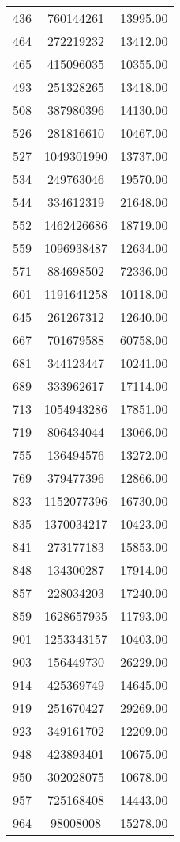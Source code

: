 \begin{centering}
\begin{supertabular}{|c|c|c|}
  436 & 760144261 & 13995.00 \\ 
  464 & 272219232 & 13412.00 \\ 
  465 & 415096035 & 10355.00 \\ 
  493 & 251328265 & 13418.00 \\ 
  508 & 387980396 & 14130.00 \\ 
  526 & 281816610 & 10467.00 \\ 
  527 & 1049301990 & 13737.00 \\ 
  534 & 249763046 & 19570.00 \\ 
  544 & 334612319 & 21648.00 \\ 
  552 & 1462426686 & 18719.00 \\ 
  559 & 1096938487 & 12634.00 \\ 
  571 & 884698502 & 72336.00 \\ 
  601 & 1191641258 & 10118.00 \\ 
  645 & 261267312 & 12640.00 \\ 
  667 & 701679588 & 60758.00 \\ 
  681 & 344123447 & 10241.00 \\ 
  689 & 333962617 & 17114.00 \\ 
  713 & 1054943286 & 17851.00 \\ 
  719 & 806434044 & 13066.00 \\ 
  755 & 136494576 & 13272.00 \\ 
  769 & 379477396 & 12866.00 \\ 
  823 & 1152077396 & 16730.00 \\ 
  835 & 1370034217 & 10423.00 \\ 
  841 & 273177183 & 15853.00 \\ 
  848 & 134300287 & 17914.00 \\ 
  857 & 228034203 & 17240.00 \\ 
  859 & 1628657935 & 11793.00 \\ 
  901 & 1253343157 & 10403.00 \\ 
  903 & 156449730 & 26229.00 \\ 
  914 & 425369749 & 14645.00 \\ 
  919 & 251670427 & 29269.00 \\ 
  923 & 349161702 & 12209.00 \\ 
  948 & 423893401 & 10675.00 \\ 
  950 & 302028075 & 10678.00 \\ 
  957 & 725168408 & 14443.00 \\ 
  964 & 98008008 & 15278.00 \\ 

\end{supertabular}
\end{centering}
